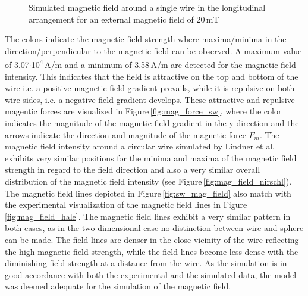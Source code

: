 \begin{figure}[H]
        \caption[Simulated magnetic field around a single wire]{Simulated magnetic field around a single wire in the longitudinal arrangement for an external magnetic field of 20\,mT}
        \label{fig:sw_fm_mag_field}
  \end{figure}

% 

The colors indicate the magnetic field strength where maxima/minima in the direction/perpendicular to the magnetic field can be observed. A maximum value of 3.07$\cdotp$10\textsuperscript{4}\,A/m and a minimum of 3.58\,A/m are detected for the magnetic field intensity. This indicates that the field is attractive on the top and bottom of the wire i.e. a positive magnetic field gradient prevails, while it is repulsive on both wire sides, i.e. a negative field gradient develops. These attractive and repulsive magentic forces are visualized in Figure\,\ref{fig:mag_force_sw}, where the color indicates the magnitude of the magnetic field gradient in the y-direction and the arrows indicate the direction and magnitude of the magnetic force $F_{m}$. The magnetic field intensity around a circular wire simulated by Lindner et al. \cite{lindner2013simulation} exhibits very similar positions for the minima and maxima of the magnetic field strength in regard to the field direction and also a very similar overall distribution of the magnetic field intensity (see Figure\,\ref{fig:mag_field_nirschl}). The magnetic field lines depicted in Figure\,\ref{fig:sw_mag_field} also match with the experimental visualization of the magnetic field lines in Figure\,\ref{fig:mag_field_hale}. The magnetic field lines exhibit a very similar pattern in both cases, as in the two-dimensional case no distinction between wire and sphere can be made. The field lines are denser in the close vicinity of the wire reflecting the high magnetic field strength, while the field lines become less dense with the diminishing field strength at a distance from the wire. As the simulation is in good accordance with both the experimental and the simulated data, the model was deemed adequate for the simulation of the magnetic field.  

